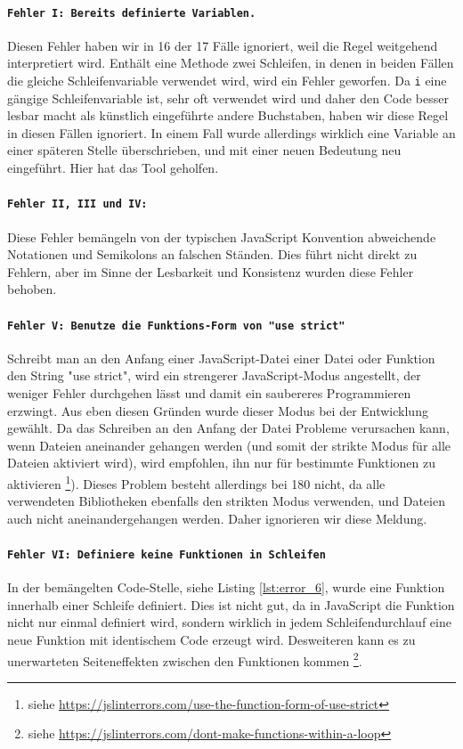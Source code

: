\documentclass[ngerman]{article}
\begin{document}
\paragraph{\texttt{Fehler I: Bereits definierte Variablen.}}
Diesen Fehler haben wir in 16 der 17 Fälle ignoriert, weil die Regel weitgehend interpretiert wird.
Enthält eine Methode zwei Schleifen, in denen in beiden Fällen die gleiche Schleifenvariable verwendet wird, wird ein Fehler geworfen.
Da \texttt{i} eine gängige Schleifenvariable ist, sehr oft verwendet wird und daher den Code besser lesbar macht als künstlich eingeführte andere Buchstaben, haben wir diese Regel in diesen Fällen ignoriert.
In einem Fall wurde allerdings wirklich eine Variable an einer späteren Stelle überschrieben, und mit einer neuen Bedeutung neu eingeführt.
Hier hat das Tool geholfen.

\paragraph{\texttt{Fehler II, III und IV:}}
Diese Fehler bemängeln von der typischen JavaScript Konvention abweichende Notationen und Semikolons an falschen Ständen.
Dies führt nicht direkt zu Fehlern, aber im Sinne der Lesbarkeit und Konsistenz wurden diese Fehler behoben.

\paragraph{\texttt{Fehler V: Benutze die Funktions-Form von "use strict"}}
Schreibt man an den Anfang einer JavaScript-Datei einer Datei oder Funktion den String "use strict", wird ein strengerer JavaScript-Modus angestellt, der weniger Fehler durchgehen lässt und damit ein saubereres Programmieren erzwingt.
Aus eben diesen Gründen wurde dieser Modus bei der Entwicklung gewählt.
Da das Schreiben an den Anfang der Datei Probleme verursachen kann, wenn Dateien aneinander gehangen werden (und somit der strikte Modus für alle Dateien aktiviert wird), wird empfohlen, ihn nur für bestimmte Funktionen zu aktivieren \footnote{siehe \url{https://jslinterrors.com/use-the-function-form-of-use-strict}}).
Dieses Problem besteht allerdings bei 180 nicht, da alle verwendeten Bibliotheken ebenfalls den strikten Modus verwenden, und Dateien auch nicht aneinandergehangen werden.
Daher ignorieren wir diese Meldung.

\paragraph{\texttt{Fehler VI: Definiere keine Funktionen in Schleifen}}
In der be\-män\-gel\-ten Code-Stelle, siehe Listing \ref{lst:error_6}, wurde eine Funktion innerhalb einer Schleife definiert.
Dies ist nicht gut, da in JavaScript die Funktion nicht nur einmal definiert wird, sondern wirklich in jedem Schleifendurchlauf eine neue Funktion mit identischem Code erzeugt wird.
Desweiteren kann es zu unerwarteten Seiteneffekten zwischen den Funktionen kommen \footnote{siehe \url{https://jslinterrors.com/dont-make-functions-within-a-loop}}.
\end{document}
